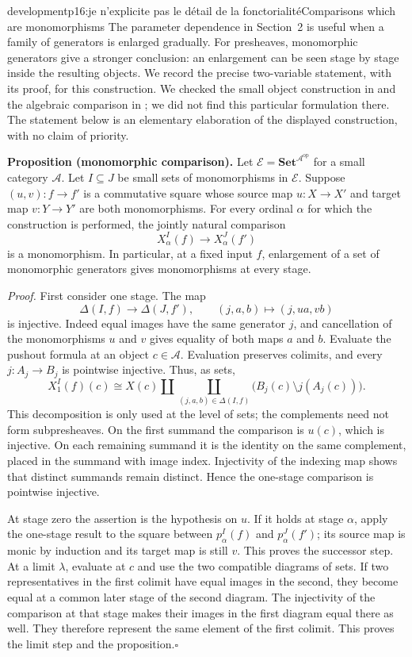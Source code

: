 \begin{dcomment}{development}{p16:je n'explicite pas le détail de la fonctorialité}{Comparisons which are monomorphisms}
The parameter dependence in Section~2 is useful when a family of generators is enlarged gradually. For presheaves, monomorphic generators give a stronger conclusion: an enlargement can be seen stage by stage inside the resulting objects. We record the precise two-variable statement, with its proof, for this construction. We checked the small object construction in \citet[Section~12.2]{Riehl2014} and the algebraic comparison in \citet[Sections~3--4]{Garner2009}; we did not find this particular formulation there. The statement below is an elementary elaboration of the displayed construction, with no claim of priority.

\textbf{Proposition (monomorphic comparison).}\ours
Let $\mathcal E=\mathbf{Set}^{\mathcal A^{\mathrm{op}}}$ for a small category $\mathcal A$. Let $I\subseteq J$ be small sets of monomorphisms in $\mathcal E$. Suppose $(u,v):f\to f'$ is a commutative square whose source map $u:X\to X'$ and target map $v:Y\to Y'$ are both monomorphisms. For every ordinal $\alpha$ for which the construction is performed, the jointly natural comparison
\[
 X_\alpha^I(f)\longrightarrow X_\alpha^J(f')
\]
is a monomorphism. In particular, at a fixed input $f$, enlargement of a set of monomorphic generators gives monomorphisms at every stage.

\textit{Proof.} First consider one stage. The map
\[
 \Delta(I,f)\longrightarrow\Delta(J,f'),\qquad
 (j,a,b)\longmapsto(j,ua,vb)
\]
is injective. Indeed equal images have the same generator $j$, and cancellation of the monomorphisms $u$ and $v$ gives equality of both maps $a$ and $b$. Evaluate the pushout formula at an object $c\in\mathcal A$. Evaluation preserves colimits, and every $j:A_j\to B_j$ is pointwise injective. Thus, as sets,
\[
 X_1^I(f)(c)\cong X(c)\amalg
 \coprod_{(j,a,b)\in\Delta(I,f)}
 \bigl(B_j(c)\setminus j(A_j(c))\bigr).
\]
This decomposition is only used at the level of sets; the complements need not form subpresheaves. On the first summand the comparison is $u(c)$, which is injective. On each remaining summand it is the identity on the same complement, placed in the summand with image index. Injectivity of the indexing map shows that distinct summands remain distinct. Hence the one-stage comparison is pointwise injective.

At stage zero the assertion is the hypothesis on $u$. If it holds at stage $\alpha$, apply the one-stage result to the square between $p_\alpha^I(f)$ and $p_\alpha^J(f')$; its source map is monic by induction and its target map is still $v$. This proves the successor step. At a limit $\lambda$, evaluate at $c$ and use the two compatible diagrams of sets. If two representatives in the first colimit have equal images in the second, they become equal at a common later stage of the second diagram. The injectivity of the comparison at that stage makes their images in the first diagram equal there as well. They therefore represent the same element of the first colimit. This proves the limit step and the proposition.\hfill$\square$


\end{dcomment}
